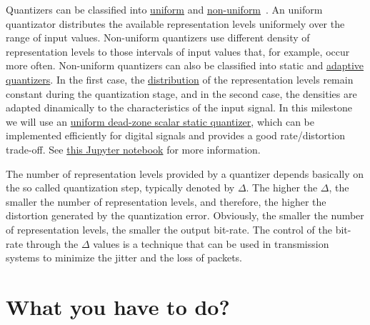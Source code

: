 Quantizers can be classified into
\href{https://en.wikipedia.org/wiki/Quantization_(signal_processing)#Mid-riser_and_mid-tread_uniform_quantizers}{uniform}
and
\href{https://nptel.ac.in/content/storage2/courses/117104069/chapter_5/5_5.html}{non-uniform}~\cite{sayood2017introduction,vetterli2014foundations}. An
uniform quantizator distributes the available representation levels
uniformely over the range of input values. Non-uniform quantizers use
different density of representation levels to those intervals of input
values that, for example, occur more often. Non-uniform quantizers can
also be classified into static and
\href{https://en.wikipedia.org/wiki/Adaptive_differential_pulse-code_modulation}{adaptive
  quantizers}. In the first case, the
\href{https://en.wikipedia.org/wiki/Probability_distribution}{distribution}
of the representation levels remain constant during the quantization
stage, and in the second case, the densities are adapted dinamically
to the characteristics of the input signal. In this milestone we will
use an
\href{https://en.wikipedia.org/wiki/Quantization_(signal_processing)#Dead-zone_quantizers}{uniform
  dead-zone scalar static quantizer}, which can be implemented
efficiently for digital signals and provides a good rate/distortion
trade-off. See \href{}{this Jupyter notebook} for more information.

The number of representation levels provided by a quantizer depends
basically on the so called quantization step, typically denoted by
$\Delta$. The higher the $\Delta$, the smaller the number of
representation levels, and therefore, the higher the distortion
generated by the quantization error. Obviously, the smaller the number
of representation levels, the smaller the output bit-rate. The control
of the bit-rate through the $\Delta$ values is a technique that
can be used in transmission systems to minimize the jitter and the
loss of packets.

\section{What you have to do?}

